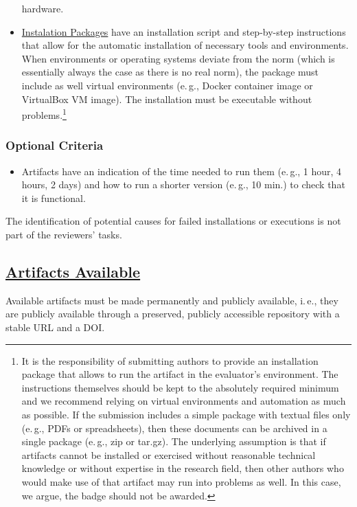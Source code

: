 \documentclass[twoside,a4paper]{refart}
\newcommand{\ie}{i.\,e.,\xspace}
\newcommand{\eg}{e.\,g.,\xspace}
\newcommand{\available}{\protect\hyperlink{available}{Artifacts Available}\xspace}
\newcommand{\ipackages}{\protect\hyperlink{ipackage}{Instalation Packages}\xspace}
\begin{document}
\begin{itemize}
  hardware.
\item[\Checkedbox] \ipackages have an installation script and
  step-by-step instructions that allow for the automatic installation
  of necessary tools and environments. When environments or operating
  systems deviate from the norm (which is essentially always the case
  as there is no real norm), the package must include as well virtual
  environments (\eg Docker container image or VirtualBox VM image).
  The installation must be executable without problems.\footnote{It is
    the responsibility of submitting authors to provide an
    installation package that allows to run the artifact in the
    evaluator’s environment. The instructions themselves should be
    kept to the absolutely required minimum and we recommend relying
    on virtual environments and automation as much as possible. If the
    submission includes a simple package with textual files only (\eg
    PDFs or spreadsheets), then these documents can be archived in a
    single package (\eg zip or tar.gz). The underlying assumption is
    that if artifacts cannot be installed or exercised without
    reasonable technical knowledge or without expertise in the
    research field, then other authors who would make use of that
    artifact may run into problems as well. In this case, we argue,
    the badge should not be awarded.}
\end{itemize}  

\subsubsection{Optional Criteria}

\begin{itemize}
\item[\Checkedbox] Artifacts have an indication of the time needed to
  run them (\eg 1 hour, 4 hours, 2 days) and how to run a shorter
  version (\eg 10 min.) to check that it is functional.
\end{itemize}

\attention The identification of potential causes for failed
installations or executions is not part of the reviewers' tasks.

\subsection{\available}

Available artifacts must be made permanently and publicly available,
\ie they are publicly available through a preserved, publicly
accessible repository with a stable URL and a DOI. 
\end{document}

